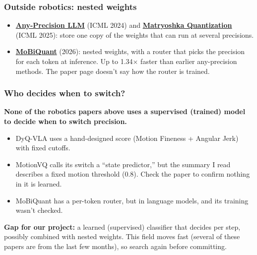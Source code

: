 \documentclass[11pt]{article}
\begin{document}
\subsubsection{Outside robotics: nested weights}\label{outside-robotics-nested-weights}

\begin{itemize}
\item \textbf{\href{https://arxiv.org/pdf/2402.10517}{Any-Precision LLM}} (ICML 2024) and \textbf{\href{https://arxiv.org/abs/2502.06786v2}{Matryoshka Quantization}} (ICML 2025): store one copy of the weights that can run at several precisions.
\item \textbf{\href{https://arxiv.org/abs/2602.20191}{MoBiQuant}} (2026): nested weights, with a router that picks the precision for each token at inference. Up to 1.34$\times$ faster than earlier any-precision methods. The paper page doesn't say how the router is trained.
\end{itemize}

\subsubsection{Who decides when to switch?}\label{who-decides-when-to-switch}

\textbf{None of the robotics papers above uses a supervised (trained) model to decide when to switch precision.}

\begin{itemize}
\item DyQ-VLA uses a hand-designed score (Motion Fineness + Angular Jerk) with fixed cutoffs.
\item MotionVQ calls its switch a ``state predictor,'' but the summary I read describes a fixed motion threshold (0.8). Check the paper to confirm nothing in it is learned.
\item MoBiQuant has a per-token router, but in language models, and its training wasn't checked.
\end{itemize}

\textbf{Gap for our project:} a learned (supervised) classifier that decides per step, possibly combined with nested weights. This field moves fast (several of these papers are from the last few months), so search again before committing.
\end{document}
